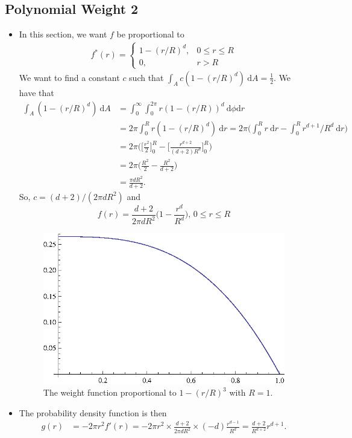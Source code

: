 \documentclass[10pt]{article}
\newcommand{\dee}{\mathrm{d}}
\begin{document}
\subsection{Polynomial Weight 2}
\begin{itemize}
	\item  In this section, we want $f$ be proportional to 
		\begin{align*}
			f^*(r) = \begin{cases}
				1 - (r/R)^d, & 0 \leq r \leq R \\
				0, & r > R
			\end{cases}
		\end{align*}
		We want to find a constant $c$ such that 
		$\int_A c(1 - (r/R)^d)\ \dee A = \frac{1}{2}.$ 
		We have that
		\begin{align*}
			\int_A (1 - (r/R)^d)\ \dee A 
			&= \int_0^\infty \int_0^{2\pi} r(1 - (r/R))^d\ \dee \phi \dee r\\
			&= 2\pi \int_0^{R} r(1- (r/R)^d) \ \dee r = 2\pi \bigg( \int_0^{R} r\ \dee r - \int_0^R r^{d+1}/R^d\ \dee r \bigg)\\
			&= 2\pi \bigg( \bigg[ \frac{r^2}{2} \bigg]_0^R - \bigg[ \frac{r^{d+2}}{(d+2)R^d} \bigg]_0^R \bigg)\\
			&= 2\pi \bigg( \frac{R^2}{2} - \frac{R^2}{d+2} \bigg)\\
			&= \frac{\pi d R^2}{d+2}.
		\end{align*}
		So, $c = (d+2) / (2\pi d R^2)$ and 
		$$f(r) = \frac{d+2}{2 \pi d R^2}\bigg(1 - \frac{r^d}{R^d}\bigg)\mbox{, $0 \leq r \leq R$}$$
		\begin{figure}[h]
			\centering
			\includegraphics{one-minus-cubic.eps}
			\caption{The weight function proportional to $1 - (r/R)^3$ with $R = 1$.}
		\end{figure}
	\item The probability density function is then
		\begin{align*}
			g(r) 
			&= -2\pi r^2 f'(r) = - 2\pi r^2 \times \frac{d+2}{2\pi d R^2} \times (-d) \frac{r^{d-1}}{R^d} = \frac{d+2}{R^{d+2}}r^{d+1}.
		\end{align*}
	

\end{itemize}
\end{document}
